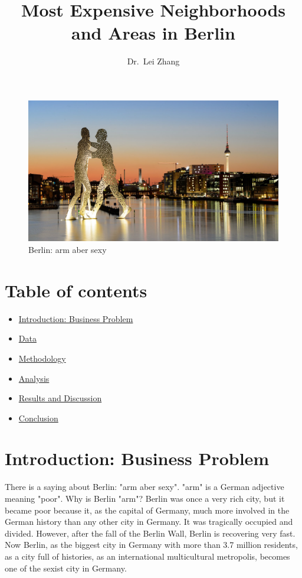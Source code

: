\documentclass[11pt]{article}
\title{Most Expensive Neighborhoods and Areas in Berlin}
\author{Dr.~Lei Zhang}
\providecommand{\tightlist}{%
      \setlength{\itemsep}{0pt}\setlength{\parskip}{0pt}}
\begin{document}
    
    \maketitle
    



\begin{figure}
\centering
\includegraphics[scale=1.3]{berlin.jpg}
\caption{Berlin: arm aber sexy}
\end{figure}

    \hypertarget{table-of-contents}{%
\section{Table of contents}\label{table-of-contents}}

\begin{itemize}
\tightlist
\item
  \hyperref[introduction]{Introduction: Business Problem}
\item
  \hyperref[data]{Data}
\item
  \hyperref[methodology]{Methodology}
\item
  \hyperref[analysis]{Analysis}
\item
  \hyperref[results]{Results and Discussion}
\item
  \hyperref[conclusion]{Conclusion}
\end{itemize}

    \hypertarget{introduction-business-problem}{%
\section{\texorpdfstring{Introduction: Business Problem
}{Introduction: Business Problem }}\label{introduction}}


There is a saying about Berlin: "arm aber sexy". "arm" is a German adjective
meaning "poor". Why is Berlin "arm"? Berlin was once a very rich city, but
it became poor because it, as the capital of Germany, much more involved in
the German history than any other city in Germany. It was tragically
occupied and divided. However, after the fall of the Berlin Wall, Berlin is 
recovering very fast. Now Berlin,  as the biggest city in Germany with more
than 3.7 million residents, as a city full of histories, as an
international multicultural metropolis, becomes one of the sexist city in Germany.
\end{document}
